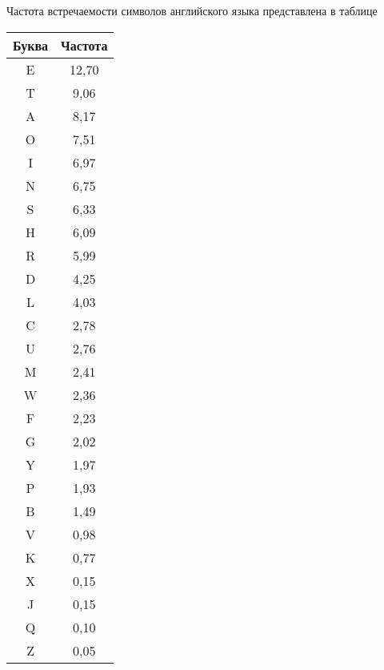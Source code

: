 \documentclass[10pt, a4paper]{article}
\begin{document}
{		\noindent Частота встречаемости символов английского языка представлена в таблице
		
		
		\newpage
		\begin{tabular}{|c|c|}
			\hline
			Буква & Частота \\ \hline
			E & 12,70 \\ \hline
			T & 9,06 \\ \hline
			A & 8,17 \\ \hline
			O & 7,51 \\ \hline
			I & 6,97 \\ \hline
			N & 6,75 \\ \hline
			S & 6,33 \\ \hline
			H & 6,09 \\ \hline
			R & 5,99 \\ \hline
			D & 4,25 \\ \hline
			L & 4,03 \\ \hline
			C & 2,78 \\ \hline
			U & 2,76 \\ \hline
			M & 2,41 \\ \hline
			W & 2,36 \\ \hline
			F & 2,23 \\ \hline
			G & 2,02 \\ \hline
			Y & 1,97 \\ \hline
			P & 1,93 \\ \hline
			B & 1,49 \\ \hline
			V & 0,98 \\ \hline
			K & 0,77 \\ \hline
			X & 0,15 \\ \hline
			J & 0,15 \\ \hline
			Q & 0,10 \\ \hline
			Z & 0,05 \\ \hline
		\end{tabular}
	}
	
\end{document}
